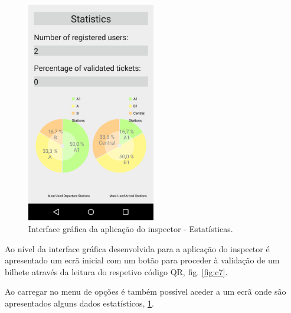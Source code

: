 \documentclass[12pt]{article}
\begin{document}
\begin{figure}[H]
	\centering
	\includegraphics[width=0.5\textwidth]{Screenshot_Inspector_Statistics.png}
	\caption{Interface gráfica da aplicação do inspector - Estatísticas.}
	\label{fig:c8}
\end{figure}

Ao nível da interface gráfica desenvolvida para a aplicação do inspector é apresentado um ecrã inicial com um botão para proceder à validação de um bilhete através da leitura do respetivo código QR, fig. \ref{fig:c7}.

Ao carregar no menu de opções é também possível aceder a um ecrã onde são apresentados alguns dados estatísticos, \ref{fig:c8}.
\end{document}
